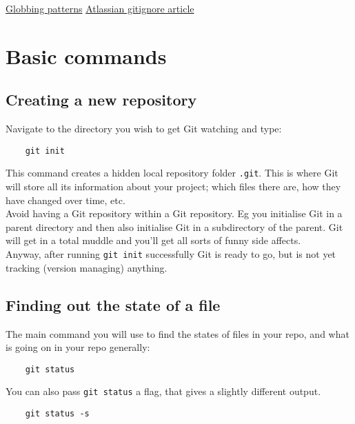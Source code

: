 \href{https://linux.die.net/man/7/glob}{Globbing patterns}
\href{https://www.atlassian.com/git/tutorials/saving-changes/gitignore}{Atlassian gitignore article}


\section{Basic commands}

\subsection{Creating a new repository}

Navigate to the directory you wish to get Git watching and type:

\begin{verbatim}
    git init
\end{verbatim}

This command creates a hidden local repository folder \texttt{.git}. This is where Git will store all its information about your project; which files there are, how they have changed over time, etc.
\\

Avoid having a Git repository within a Git repository. Eg you initialise Git in a parent directory and then also initialise Git in a subdirectory of the parent. Git will get in a total muddle and you'll get all sorts of funny side affects. 
\\

Anyway, after running \texttt{git init} successfully Git is ready to go, but is not yet tracking (version managing) anything.


\subsection{Finding out the state of a file}

The main command you will use to find the states of files in your repo, and what is going on in your repo generally:

\begin{verbatim}
    git status
\end{verbatim}


You can also pass \texttt{git status} a flag, that gives a slightly different output.

\begin{verbatim}
    git status -s
\end{verbatim}

